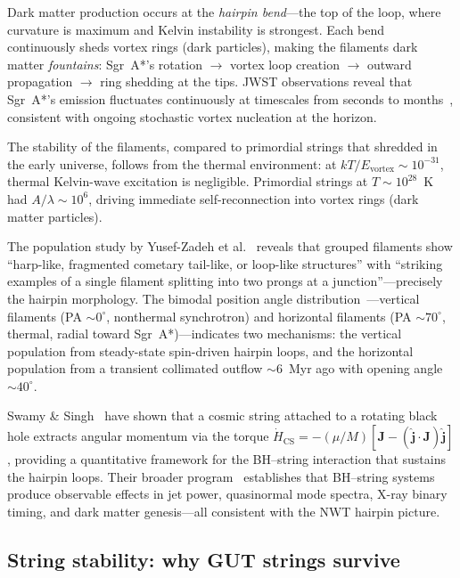 \documentclass[11pt]{article}
\begin{document}
Dark matter production occurs at the \emph{hairpin bend}---the top of the loop, where curvature is maximum and Kelvin instability is strongest.
Each bend continuously sheds vortex rings (dark particles), making the filaments dark matter \emph{fountains}: Sgr~A*'s rotation $\to$ vortex loop creation $\to$ outward propagation $\to$ ring shedding at the tips.
JWST observations reveal that Sgr~A*'s emission fluctuates continuously at timescales from seconds to months~\cite{YusefZadeh2025JWST}, consistent with ongoing stochastic vortex nucleation at the horizon.

The stability of the filaments, compared to primordial strings that shredded in the early universe, follows from the thermal environment: at $kT/E_\text{vortex} \sim 10^{-31}$, thermal Kelvin-wave excitation is negligible.
Primordial strings at $T \sim 10^{28}$~K had $A/\lambda \sim 10^6$, driving immediate self-reconnection into vortex rings (dark matter particles).

The population study by Yusef-Zadeh et al.~\cite{YusefZadeh2022spacing} reveals that grouped filaments show ``harp-like, fragmented cometary tail-like, or loop-like structures'' with ``striking examples of a single filament splitting into two prongs at a junction''---precisely the hairpin morphology.
The bimodal position angle distribution~\cite{YusefZadeh2023horizontal}---vertical filaments (PA $\sim 0^\circ$, nonthermal synchrotron) and horizontal filaments (PA $\sim 70^\circ$, thermal, radial toward Sgr~A*)---indicates two mechanisms: the vertical population from steady-state spin-driven hairpin loops, and the horizontal population from a transient collimated outflow $\sim 6$~Myr ago with opening angle $\sim 40^\circ$.

Swamy \& Singh~\cite{Swamy2025} have shown that a cosmic string attached to a rotating black hole extracts angular momentum via the torque $\dot{H}_\text{CS} = -(\mu/M)[\mathbf{J} - (\hat{\mathbf{j}}\cdot\mathbf{J})\hat{\mathbf{j}}]$, providing a quantitative framework for the BH--string interaction that sustains the hairpin loops.
Their broader program~\cite{Swamy2025accretion,Swamy2025QNM,Swamy2025Xray,Swamy2025DM} establishes that BH--string systems produce observable effects in jet power, quasinormal mode spectra, X-ray binary timing, and dark matter genesis---all consistent with the NWT hairpin picture.

\subsection{String stability: why GUT strings survive}
\end{document}
